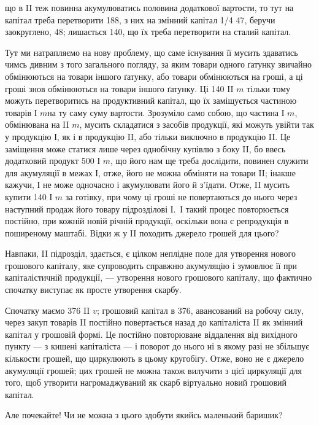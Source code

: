 \parcont{}  %
що в II теж повинна акумулюватись половина додаткової вартости,
то тут на капітал треба перетворити 188, з них на змінний капітал
1/4 \deq{} 47, беручи заокруглено, 48; лишається 140, що їх треба
перетворити на сталий капітал.

Тут ми натрапляємо на нову проблему, що саме існування її мусить
здаватись чимсь дивним з того загального погляду, за яким
товари одного ґатунку звичайно обмінюються на товари іншого ґатунку,
або товари обмінюються на гроші, а ці гроші знов обмінюються на
товари іншого ґатунку. Ці 140 II $m$ тільки тому можуть перетворитись
на продуктивний капітал, що їх заміщується частиною товарів І $m $на
ту саму суму вартости. Зрозуміло само собою, що частина І $m$, обмінювана
на II $m$, мусить складатися з засобів продукції, які можуть
увійти так у продукцію І, як і в продукцію II, або тільки виключно
в продукцію II. Це заміщення може статися лише через
однобічну купівлю з боку II, бо ввесь додатковий продукт 500 І $m$, що
його нам ще треба дослідити, повинен служити для акумуляції в межах І,
отже, його не можна обміняти на товари II; інакше кажучи, І не може
одночасно і акумулювати його й з’їдати. Отже, II мусить купити 140 І $m$
за готівку, при чому ці гроші не повертаються до нього через наступний
продаж його товару підрозділові І.~І такий процес повторюється постійно,
при кожній новій річній продукції, оскільки вона є репродукція в поширеному
маштабі. Відки ж у II походить джерело грошей для цього?

Навпаки, II підрозділ, здається, є цілком неплідне поле для утворення
нового грошового капіталу, яке супроводить справжню акумуляцію і
зумовлює її при капіталістичній продукції, — утворення нового грошового
капіталу, що фактично спочатку виступає як просте утворення
скарбу.

Спочатку маємо 376 II $v$; грошовий капітал в 376, авансований на
робочу силу, через закуп товарів II постійно повертається назад до
капіталіста II як змінний капітал у грошовій формі. Це постійно повторюване
віддалення від вихідного пункту — з кишені капіталіста — і поворот
до нього ні в якому разі не збільшує кількости грошей, що
циркулюють в цьому кругобігу. Отже, воно не є джерело акумуляції
грошей; цих грошей не можна також вилучити з цієї циркуляції для
того, щоб утворити нагромаджуваний як скарб віртуально новий грошовий
капітал.

Але почекайте! Чи не можна з цього здобути якийсь маленький
баришик?

